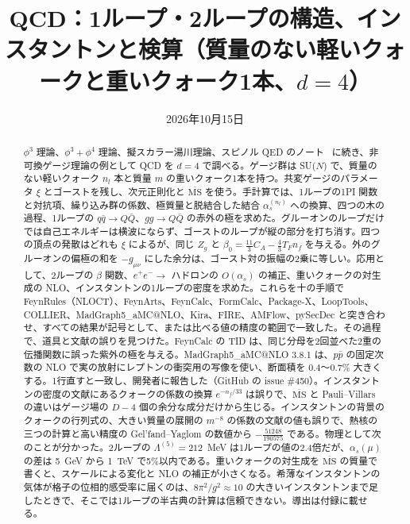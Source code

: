 \documentclass[a4paper,10pt]{ltjsarticle}
\title{QCD：1ループ・2ループの構造、インスタントンと検算（質量のない軽いクォークと重いクォーク1本、$d=4$）}
\author{}
\date{2026年10月15日}
\newcommand{\MSbar}{\overline{\mathrm{MS}}}
\begin{document}
\maketitle

\begin{abstract}
$\phi^3$ 理論、$\phi^3+\phi^4$ 理論、擬スカラー湯川理論、スピノル QED のノート~\cite{phi3note,phi34note,yukawanote,qednote} に続き、非可換ゲージ理論の例として QCD を $d=4$ で調べる。ゲージ群は SU($N$) で、質量のない軽いクォーク $n_l$ 本と質量 $m$ の重いクォーク1本を持つ。共変ゲージのパラメータ $\xi$ とゴーストを残し、次元正則化と $\MSbar$ を使う。手計算では、1ループの1PI 関数と対抗項、繰り込み群の係数、極質量と脱結合した結合 $\alpha_s^{(n_l)}$ への換算、四つの木の過程、1ループの $q\bar q\to Q\bar Q$、$gg\to Q\bar Q$ の赤外の極を求めた。グルーオンのループだけでは自己エネルギーは横波にならず、ゴーストのループが縦の部分を打ち消す。四つの頂点の発散はどれも $\xi$ によるが、同じ $Z_g$ と $\beta_0=\frac{11}3C_A-\frac43T_Fn_f$ を与える。外のグルーオンの偏極の和を $-g_{\mu\nu}$ にした余分は、ゴースト対の振幅の2乗に等しい。応用として、2ループの $\beta$ 関数、$e^+e^-\to$ ハドロンの $O(\alpha_s)$ の補正、重いクォークの対生成の NLO、インスタントンの1ループの密度を求めた。これらを十の手順で FeynRules（NLOCT）、FeynArts、FeynCalc、FormCalc、Package-X、LoopTools、COLLIER、MadGraph5\_aMC@NLO、Kira、FIRE、AMFlow、pySecDec と突き合わせ、すべての結果が記号として、または比べる値の精度の範囲で一致した。その過程で、道具と文献の誤りを見つけた。FeynCalc の TID は、同じ分母を2回並べた2重の伝播関数に誤った紫外の極を与える。MadGraph5\_aMC@NLO 3.8.1 は、$p\bar p$ の固定次数の NLO で実の放射にレプトンの衝突用の写像を使い、断面積を $0.4$〜$0.7\%$ 大きくする。1行直すと一致し、開発者に報告した（GitHub の issue \#450）。インスタントンの密度の文献にあるクォークの係数の換算 $e^{-n_f/33}$ は誤りで、$\MSbar$ と Pauli--Villars の違いはゲージ場の $D-4$ 個の余分な成分だけから生じる。インスタントンの背景のクォークの行列式の、大きい質量の展開の $m^{-8}$ の係数の文献の値も誤りで、熱核の三つの計算と高い精度の Gel'fand--Yaglom の数値から $-\frac{51248}{190575}$ である。物理として次のことが分かった。2ループの $\Lambda^{(5)}=212$~MeV は1ループの値の2.4倍だが、$\alpha_s(\mu)$ の差は 5~GeV から 1~TeV で5\%以内である。重いクォークの対生成を $\MSbar$ の質量で書くと、スケールによる変化と NLO の補正が小さくなる。希薄なインスタントンの気体が格子の位相的感受率に届くのは、$8\pi^2/g^2\approx10$ の大きいインスタントンまで足したときで、そこでは1ループの半古典の計算は信頼できない。導出は付録に載せる。
\end{abstract}
\end{document}
